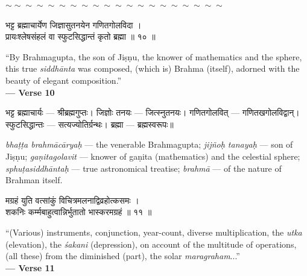 \documentclass[11pt,a4paper]{article}
\newcommand{\dev}[1]{{\devanagarifont #1}}
\newenvironment{bilingualverse}{%
  \begin{paracol}{2}
  \fontsize{10.5}{13}\selectfont
}{%
  \end{paracol}
  \vspace{0.3cm}
}
\newcommand{\wavydivider}{\begin{center}$\sim\sim\sim\sim\sim\sim\sim\sim\sim\sim\sim\sim\sim\sim\sim\sim\sim\sim\sim\sim$\end{center}}
\newenvironment{paracol}[1]{\begingroup}{\endgroup}
\newenvironment{leftcolumn*}{\begingroup}{\endgroup}
\newenvironment{rightcolumn}{\begingroup}{\endgroup}
\begin{document}
\wavydivider

\begin{bilingualverse}
\begin{leftcolumn*}
\dev{भट्ट ब्रह्माचार्येण जिज्ञासुतनयेन गणितगोलविदा ।}\\
\dev{प्रायःश्लेषसंहलं वा स्फुटसिद्धान्तं कृतो ब्रह्मा ॥ १० ॥}
\end{leftcolumn*}
\begin{rightcolumn}
``By Brahmagupta, the son of Jiṣṇu, the knower of mathematics and the sphere, this true \textit{siddhānta} was composed, (which is) Brahma (itself), adorned with the beauty of elegant composition.''\\[0.3cm]
\hfill\textbf{— Verse 10}
\end{rightcolumn}
\end{bilingualverse}

\begin{paracol}{2}
\begin{leftcolumn*}
\dev{भट्ट ब्रह्माचार्यः} — श्रीब्रह्मगुप्तः। \dev{जिज्ञोः तनयः} — जित्स्नुतनयः। \dev{गणितगोलवित्} — गणितखगोलविद्वान्। \dev{स्फुटसिद्धान्तः} — सत्यज्योतिर्ग्रन्थः। \dev{ब्रह्मा} — ब्रह्मस्वरूपः॥
\end{leftcolumn*}
\begin{rightcolumn}
\textit{bhaṭṭa brahmācāryaḥ} --- the venerable Brahmagupta; \textit{jijñoḥ tanayaḥ} --- son of Jiṣṇu; \textit{gaṇitagolavit} --- knower of gaṇita (mathematics) and the celestial sphere; \textit{sphuṭasiddhāntaḥ} --- true astronomical treatise; \textit{brahmā} --- of the nature of Brahman itself.
\end{rightcolumn}
\end{paracol}

\vspace{0.4cm}

\begin{bilingualverse}
\begin{leftcolumn*}
\dev{मग्रहं युति वत्सांकुं विचित्रमलनाद्विव्रहोत्कसमः ।}\\
\dev{शकनिः कर्म्मबाहुत्वान्निर्भुतातो भास्करमग्रहं ॥ ११ ॥}
\end{leftcolumn*}
\begin{rightcolumn}
``(Various) instruments, conjunction, year-count, diverse multiplication, the \textit{utka} (elevation), the \textit{śakani} (depression), on account of the multitude of operations, (all these) from the diminished (part), the solar \textit{maragraham}...''\\[0.3cm]
\hfill\textbf{— Verse 11}
\end{rightcolumn}
\end{bilingualverse}
\end{document}
